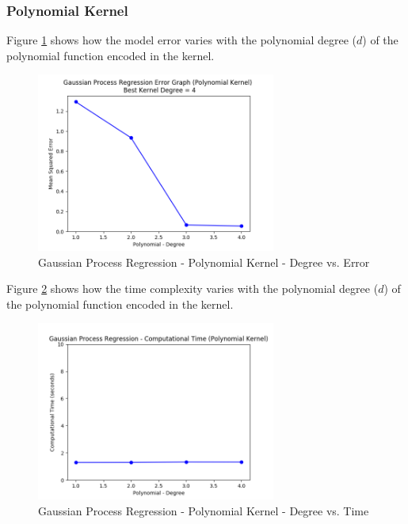 \documentclass[parskip=full]{scrartcl}
\begin{document}

        \subsubsection*{Polynomial Kernel} %
        \label{ssub:polynomial_kernel}

            Figure \ref{fig:gpr_polynomial_degree_vs_error} shows how the model error varies with the polynomial degree ($d$) of the polynomial function encoded in the kernel.

            \begin{figure}[ht]
                \centering
                \includegraphics[width=0.7\textwidth]{3c_gpr_polynomial_degree_vs_error.png}
                \caption{Gaussian Process Regression - Polynomial Kernel - Degree vs. Error}
                \label{fig:gpr_polynomial_degree_vs_error}
            \end{figure}

            Figure \ref{fig:gpr_polynomial_degree_vs_time} shows how the time complexity varies with the polynomial degree ($d$) of the polynomial function encoded in the kernel.

            \begin{figure}[ht]
                \centering
                \includegraphics[width=0.7\textwidth]{3c_gpr_polynomial_degree_vs_time.png}
                \caption{Gaussian Process Regression - Polynomial Kernel - Degree vs. Time}
                \label{fig:gpr_polynomial_degree_vs_time}
            \end{figure}
        
\end{document}
